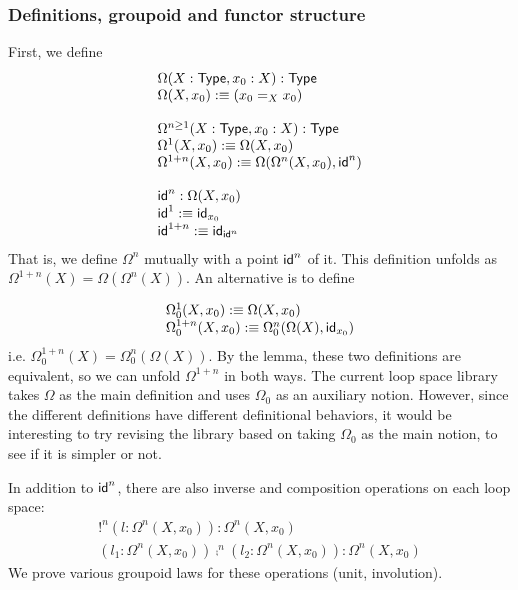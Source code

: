 \subsubsection{Definitions, groupoid and functor structure}
First, we define
\[
\begin{array}{l}
\Omega(X : \mathsf{Type},x_0 : X) : \mathsf{Type}\\
\Omega(X,x_0) :\equiv (x_0 =_X x_0) \\
\\
\Omega^{n \ge 1}(X : \mathsf{Type} , x_0 : X) : \mathsf{Type}\\
\Omega^1(X,x_0) :\equiv \Omega(X,x_0) \\
\Omega^{1+n}(X,x_0) :\equiv \Omega(\Omega^n(X,x_0), \mathsf{id}^n) \\
\\ 
\mathsf{id}^n : \Omega(X,x_0) \\
\mathsf{id}^1 :\equiv \mathsf{id}_{x_0} \\
\mathsf{id}^{1+n} :\equiv \mathsf{id}_{\mathsf{id}^n} \\
\end{array}
\]
That is, we define $\Omega^n$ mutually with a point $\mathsf{id}^n$ of it.   
This definition unfolds as $\Omega^{1+n}(X) = \Omega(\Omega^n(X))$.  An
alternative is to define

\[
\begin{array}{l}
\Omega_0^1(X,x_0) :\equiv \Omega(X,x_0) \\
\Omega_0^{1+n}(X,x_0) :\equiv \Omega_0^n(\Omega(X),\mathsf{id}_{x_0})
\end{array}
\]
i.e. $\Omega_0^{1+n}(X) = \Omega_0^n(\Omega(X))$.  By the 
lemma, these two definitions are equivalent, so we can unfold
$\Omega^{1+n}$ in both ways.  The current loop space library takes
$\Omega$ as the main definition and uses $\Omega_0$ as an auxiliary
notion.  However, since the different definitions have different   
definitional behaviors, it would be interesting to try revising the
library based on taking $\Omega_0$ as the main notion, to see if it is
simpler or not.  

In addition to $\mathsf{id}^n$, there are also inverse and composition
operations on each loop space:
\[
\begin{array}{l}
!^n (l : \Omega^n(X,x_0)) : \Omega^n(X,x_0) \\
(l_1 : \Omega^n(X,x_0)) \comp^n (l_2 : \Omega^n(X,x_0)) : \Omega^n(X,x_0)
\end{array}
\]
We prove various groupoid laws for these operations (unit, involution).

